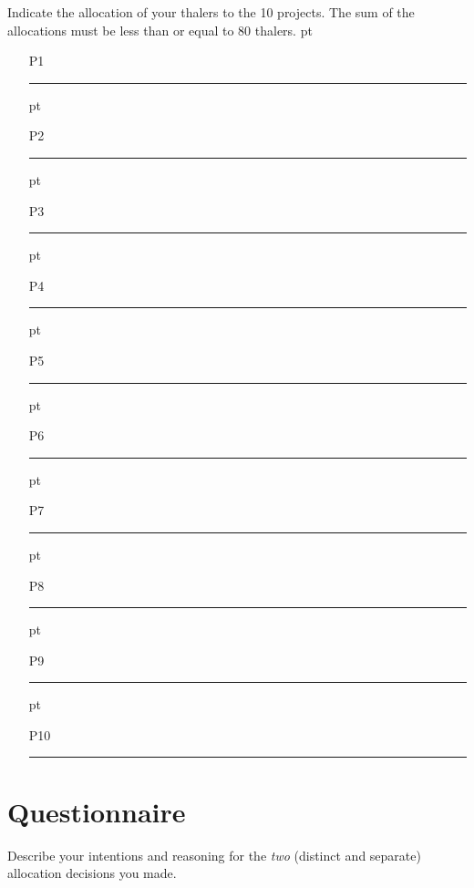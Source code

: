 \documentclass[11pt, oneside]{article}   	%
\begin{document}
Indicate the allocation of your thalers to the 10 projects. The sum of the allocations must be less than or equal to 80 thalers.
 pt
\begin{enumerate}
\setlength\itemsep{18pt}
\item[P1] \rule{6cm}{2pt}
 pt
\item[P2] \rule{6cm}{2pt}
 pt
\item[P3] \rule{6cm}{2pt}
 pt
\item[P4] \rule{6cm}{2pt}
 pt
\item[P5] \rule{6cm}{2pt}
 pt
\item[P6] \rule{6cm}{2pt}
 pt
\item[P7] \rule{6cm}{2pt}
 pt
\item[P8] \rule{6cm}{2pt}
 pt
\item[P9] \rule{6cm}{2pt}
 pt
\item[P10] \rule{6cm}{2pt}
\end{enumerate}


\section{Questionnaire}

Describe your intentions and reasoning for the \emph{two} (distinct and separate) allocation decisions you made.

\vfill


\end{document}
